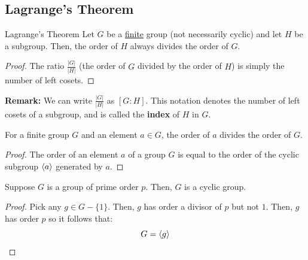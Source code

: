 \documentclass[letterpaper]{article}
\begin{document}
\subsection{Lagrange's Theorem}
\begin{theorem}{Lagrange's Theorem}
    Let $G$ be a \underline{finite} group (not necessarily cyclic) and let $H$ be a subgroup. Then, the order of $H$ always divides the order of $G$.  
\end{theorem}

\begin{mdframed}
    \begin{proof}
        The ratio $\frac{|G|}{|H|}$ (the order of $G$ divided by the order of $H$) is simply the number of left cosets. 
    \end{proof}
\end{mdframed}

\textbf{Remark:} We can write $\frac{|G|}{|H|}$ as $[G: H]$. This notation denotes the number of left cosets of a subgroup, and is called the \textbf{index} of $H$ in $G$. 

\begin{corollary}{}{}
    For a finite group $G$ and an element $a \in G$, the order of $a$ divides the order of $G$.
\end{corollary}

\begin{mdframed}
    \begin{proof}
        The order of an element $a$ of a group $G$ is equal to the order of the cyclic subgroup $\langle a \rangle$ generated by $a$. 
    \end{proof}
\end{mdframed}

\begin{corollary}{}{}
    Suppose $G$ is a group of prime order $p$. Then, $G$ is a cyclic group. 
\end{corollary}

\begin{mdframed}
    \begin{proof}
        Pick any $g \in G - \{1\}$. Then, $g$ has order a divisor of $p$ but not $1$. Then, $g$ has order $p$ so it follows that: 
        \[G = \langle g \rangle\]
    \end{proof}
\end{mdframed}
\end{document}
